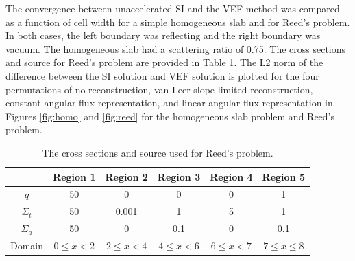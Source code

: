 The convergence between unaccelerated SI and the VEF method was compared as a function of cell width for a simple homogeneous slab and for Reed's problem. In both cases, the left boundary was reflecting and the right boundary was vacuum. The homogeneous slab had a scattering ratio of 0.75. The cross sections and source for Reed's problem are provided in Table \ref{tab:reedXS}. The L2 norm of the difference between the SI solution and VEF solution is plotted for the four permutations of no reconstruction, van Leer slope limited reconstruction, constant angular flux representation, and linear angular flux representation in Figures \ref{fig:homo} and \ref{fig:reed} for the homogeneous slab problem and Reed's problem. 

	\begin{table} \centering
		\begin{tabular}{|c|c|c|c|c|c|}
			\hline
			& Region 1 & Region 2 & Region 3 & Region 4 & Region 5 \\ 
			\hline 
			$q$ & 50 & 0 & 0 & 0 & 1 \\ 
			$\Sigma_t$ & 50 & 0.001 & 1 & 5 & 1 \\ 
			$\Sigma_a$ & 50 & 0 & 0.1 & 0 & 0.1 \\ 
			\hline 
			Domain & $0 \leq x < 2$ & $2 \leq x < 4$ & $4\leq x < 6$ &
				$6 \leq x < 7$ & $7 \leq x \leq 8$\\ 
			\hline 
		\end{tabular}
		\caption{The cross sections and source used for Reed's problem.}
		\label{tab:reedXS}
	\end{table}

